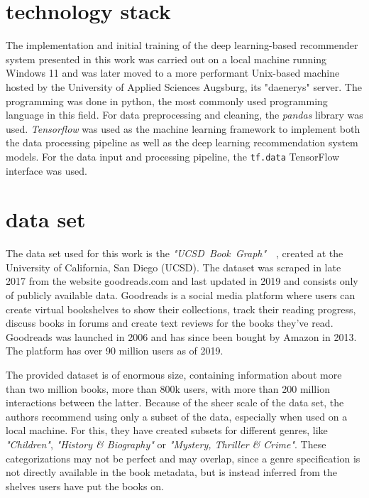 \documentclass[10pt,final,journal,a4paper,oneside,twocolumn]{IEEEtran}
\begin{document}
\section{technology stack}
The implementation and initial training of the deep learning-based recommender system presented in this work was carried out on a local machine running Windows 11 and was later moved to a more performant Unix-based machine hosted by the University of Applied Sciences Augsburg, its "daenerys" server.
The programming was done in python, the most commonly used programming language in this field. For data preprocessing and cleaning, the \emph{pandas} library was used.
\emph{Tensorflow} was used as the machine learning framework to implement both the data processing pipeline as well as the deep learning recommendation system models. For the data input and processing pipeline, the \texttt{tf.data} TensorFlow interface was used.


\section{data set}\label{sec:data}
The data set used for this work is the \emph{"UCSD~Book~Graph"}~\cite{Wan.2018}~\cite{Wan.2019}, created at the University of California, San Diego (UCSD).
The dataset was scraped in late 2017 from the website goodreads.com and last updated in 2019 and consists only of publicly available data. Goodreads is a social media platform where users can create virtual bookshelves to show their collections, track their reading progress, discuss books in forums and create text reviews for the books they've read. Goodreads was launched in 2006 and has since been bought by Amazon in 2013. The platform has over 90 million users as of 2019.

The provided dataset is of enormous size, containing information about more than two million books, more than 800k users, with more than 200 million interactions between the latter.
Because of the sheer scale of the data set, the authors recommend using only a subset of the data, especially when used on a local machine. For this, they have created subsets for different genres, like \emph{"Children"}, \emph{"History \& Biography"} or \emph{"Mystery, Thriller \& Crime"}. These categorizations may not be perfect and may overlap, since a genre specification is not directly available in the book metadata, but is instead inferred from the shelves users have put the books on.
\end{document}
